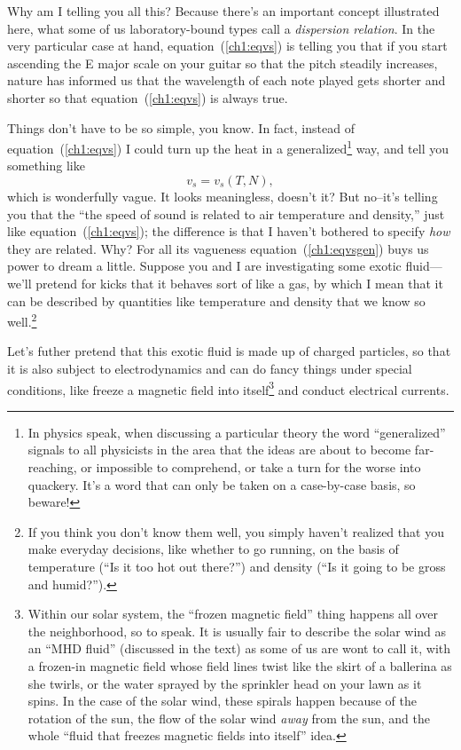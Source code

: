 Why am I telling you all this? Because there's an important concept
illustrated here, what some of us laboratory-bound types call a
\emph{dispersion relation}. In the very particular case at hand,
equation~(\ref{ch1:eqvs}) is telling you that if you start ascending
the E major scale on your guitar so that the pitch steadily increases,
nature has informed us that the wavelength of each note played gets
shorter and shorter so that equation~(\ref{ch1:eqvs}) is always true.

Things don't have to be so simple, you know. In fact, instead of
equation~(\ref{ch1:eqvs}) I could turn up the heat in a
generalized\footnote{In physics speak, when discussing a particular
  theory the word ``generalized'' signals to all physicists in the
  area that the ideas are about to become far-reaching, or impossible
  to comprehend, or take a turn for the worse into quackery. It's a
  word that can only be taken on a case-by-case basis, so beware!}
way, and tell you something like
\begin{equation}
  \label{ch1:eqvsgen}
  v_s = v_s (T, N),
\end{equation}
which is wonderfully vague. It looks meaningless, doesn't it? But
no--it's telling you that the ``the speed of sound is related to air
temperature and density,'' just like equation~(\ref{ch1:eqvs}); the
difference is that I haven't bothered to specify \emph{how} they are
related. Why? For all its vagueness equation~(\ref{ch1:eqvsgen}) buys
us power to dream a little. Suppose you and I are investigating some
exotic fluid---we'll pretend for kicks that it behaves sort of like a
gas, by which I mean that it can be described by quantities like
temperature and density that we know so well.\footnote{If you think
  you don't know them well, you simply haven't realized that you make
  everyday decisions, like whether to go running, on the basis of
  temperature (``Is it too hot out there?'') and density (``Is it
  going to be gross and humid?'').}

Let's futher pretend that this exotic fluid is made up of charged
particles, so that it is also subject to electrodynamics and can do
fancy things under special conditions, like freeze a magnetic field
into itself\footnote{Within our solar system, the ``frozen magnetic
  field'' thing happens all over the neighborhood, so to speak. It is
  usually fair to describe the solar wind as an ``MHD fluid''
  (discussed in the text) as some of us are wont to call it, with a
  frozen-in magnetic field whose field lines twist like the skirt of a
  ballerina as she twirls, or the water sprayed by the sprinkler head
  on your lawn as it spins. In the case of the solar wind, these
  spirals happen because of the rotation of the sun, the flow of the
  solar wind \emph{away} from the sun, and the whole ``fluid that
  freezes magnetic fields into itself'' idea.} and conduct electrical
currents.

